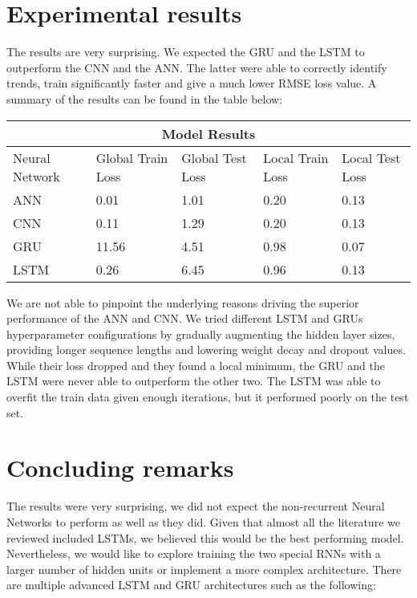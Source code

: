 \documentclass{article}
\begin{document}
\section{Experimental results}
The results are very surprising. We expected the GRU and the LSTM to outperform the CNN and the ANN. The latter were able to correctly identify trends, train significantly faster and give a much lower RMSE loss value. A summary of the results can be found in the table below:

 \begin{tabular}{|p{2.3cm}|p{2.5cm}|p{2.3cm}|p{2.5cm}|p{2.3cm}|}
 \hline
 \multicolumn{5}{|c|}{Model Results} \\
 \hline
 Neural Network & Global Train Loss & Global Test Loss & Local Train Loss & Local Test Loss\\
 \hline
 ANN  & 0.01  & 1.01 & 0.20 & 0.13\\
 CNN & 0.11  & 1.29 & 0.20 & 0.13\\
 GRU & 11.56 & 4.51 & 0.98 & 0.07\\
 LSTM & 0.26 & 6.45 & 0.96 & 0.13\\
 \hline
\end{tabular}


We are not able to pinpoint the underlying reasons driving the superior performance of the ANN and CNN. We tried different LSTM and GRUs hyperparameter configurations by gradually augmenting the hidden layer sizes, providing longer sequence lengths and lowering weight decay and dropout values. While their loss dropped and they found a local minimum, the GRU and the LSTM were never able to outperform the other two. The LSTM was able to overfit the train data given enough iterations, but it performed poorly on the test set.


\section{Concluding remarks}
The results were very surprising, we did not expect the non-recurrent Neural Networks to perform as well as they did. Given that almost all the literature we reviewed included LSTMs, we believed this would be the best performing model. Nevertheless, we would like to explore training the two special RNNs with a larger number of hidden units or implement a more complex architecture. There are multiple advanced LSTM and GRU architectures such as the following:
\end{document}
